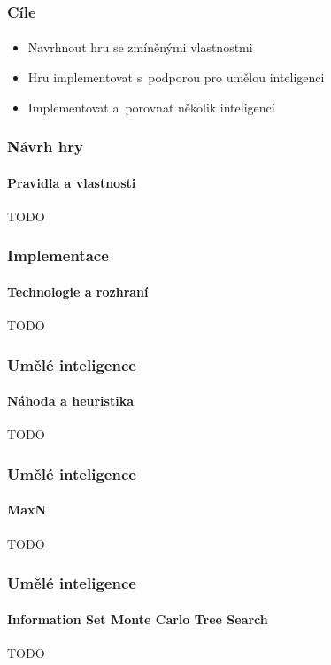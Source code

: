 \documentclass[c, 10pt]{beamer}
\begin{document}
\begin{frame}\frametitle{Cíle}
\framesubtitle{}

    \begin{itemize}\itemsep=1em
        \item Navrhnout hru se zmíněnými vlastnostmi
        \item Hru implementovat s~podporou pro umělou inteligenci
        \item Implementovat a~porovnat několik inteligencí
    \end{itemize}
\end{frame}

\begin{frame}\frametitle{Návrh hry}
\framesubtitle{Pravidla a vlastnosti}
    TODO
\end{frame}

\begin{frame}\frametitle{Implementace}
\framesubtitle{Technologie a rozhraní}
    TODO
\end{frame}

\begin{frame}\frametitle{Umělé inteligence}
\framesubtitle{Náhoda a heuristika}
    TODO
\end{frame}

\begin{frame}\frametitle{Umělé inteligence}
\framesubtitle{MaxN}
    TODO
\end{frame}

\begin{frame}\frametitle{Umělé inteligence}
\framesubtitle{Information Set Monte Carlo Tree Search}
    TODO
\end{frame}
\end{document}
